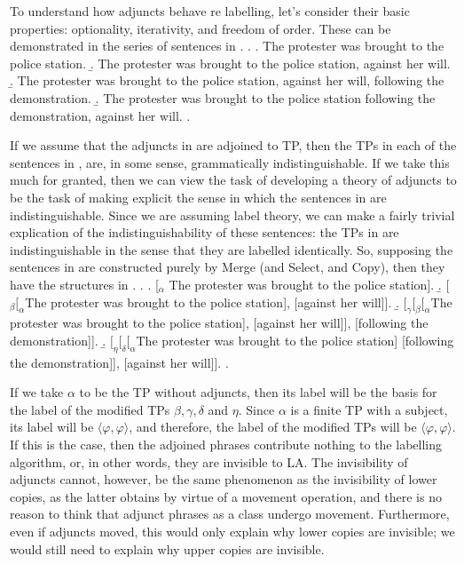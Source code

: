 \documentclass[MilwayThesis]{subfiles}
\begin{document}
To understand how adjuncts behave re labelling, let's consider their basic properties: optionality, iterativity, and freedom of order.
These can be demonstrated in the series of sentences in \Next.
\ex. 
\a. The protester was brought to the police station.
\b. The protester was brought to the police station, against her will.
\b. The protester was brought to the police station, against her will, following the demonstration.
\b. The protester was brought to the police station following the demonstration, against her will.
\z.

If we assume that the adjuncts in \Last are adjoined to TP, then the TPs in each of the sentences in \Last, are, in some sense, grammatically indistinguishable.
If we take this much for granted, then we can view the task of developing a theory of adjuncts to be the task of making explicit the sense in which the sentences in \Last are indistinguishable.
Since we are assuming label theory, we can make a fairly trivial explication of the indistinguishability of these sentences: the TPs in \Last are indistinguishable in the sense that they are labelled identically.
So, supposing the sentences in \Last are constructed purely by Merge (and Select, and Copy), then they have the structures in \Next.
\ex.
\a. [$_\alpha$ The protester was brought to the police station].
\b. [$_{\beta} [_{\alpha}$The protester was brought to the police station], [against her will]].
\b. $[_{\gamma}[_{\beta}[_{\alpha}$The protester was brought to the police station], [against her will]], [following the demonstration]].
\b. $[_{\eta} [_{\delta} [_{\alpha}$The protester was brought to the police station] [following the demonstration]], [against her will]].
\z.

If we take $\alpha$ to be the TP without adjuncts, then its label will be the basis for the label of the modified TPs $\beta, \gamma, \delta$ and $\eta$.
Since $\alpha$ is a finite TP with a subject, its label will be $\langle\varphi,\varphi\rangle$, and therefore, the label of the modified TPs will be $\langle\varphi,\varphi\rangle$.
If this is the case, then the adjoined phrases contribute nothing to the labelling algorithm, or, in other words, they are invisible to LA.
The invisibility of adjuncts cannot, however, be the same phenomenon as the invisibility of lower copies, as the latter obtains by virtue of a movement operation, and there is no reason to think that adjunct phrases as a class undergo movement.
Furthermore, even if adjuncts moved, this would only explain why lower copies are invisible; we would still need to explain why upper copies are invisible.
\end{document}
